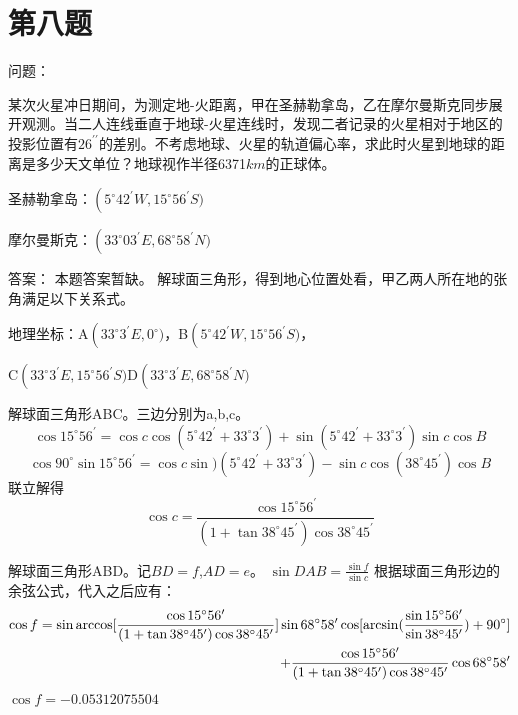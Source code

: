 \documentclass[a4paper,12pt]{report}
\begin{document}
\section{第八题}
问题：

某次火星冲日期间，为测定地-火距离，甲在圣赫勒拿岛，乙在摩尔曼斯克同步展开观测。当二人连线垂直于地球-火星连线时，发现二者记录的火星相对于地区的投影位置有$26^{\prime \prime}$的差别。不考虑地球、火星的轨道偏心率，求此时火星到地球的距离是多少天文单位？地球视作半径6371$km$的正球体。

圣赫勒拿岛：$\left(5^\circ42^\prime W,15^\circ56^\prime S)\right.$

摩尔曼斯克：$\left(33^\circ03^\prime E,68^\circ58^\prime N)\right.$

\noindent 答案：
本题答案暂缺。
\noindent 解球面三角形，得到地心位置处看，甲乙两人所在地的张角满足以下关系式。


地理坐标：A$\left(33^\circ3^\prime E,0^\circ)\right.$，B$\left(5^\circ42^\prime W,15^\circ56^\prime S)\right.$，

C$\left(33^\circ3^\prime E,15^\circ56^\prime S)\right.$D$\left(33^\circ3^\prime E,68^\circ58^\prime N)\right.$

解球面三角形ABC。三边分别为a,b,c。
\begin{equation}
	\cos15^\circ56^\prime =\cos c\cos(5^\circ42^\prime+33^\circ3^\prime)+\sin(5^\circ42^\prime+33^\circ3^\prime)\sin c\cos B
\end{equation}
\begin{equation}
	\cos 90^\circ \sin 15^\circ56^\prime=\cos c\sin )(5^\circ42^\prime+33^\circ3^\prime)-\sin c\cos(38^\circ45^\prime)\cos B
\end{equation}
联立解得
\begin{equation}
	\cos c=\frac{\cos  15^\circ56^\prime}{(1+\tan 38^\circ45^\prime)\cos 38^\circ45^\prime}
\end{equation}


解球面三角形ABD。记$BD=f$,$AD=e$。
$\sin DAB =\frac{\sin f}{\sin c}$
根据球面三角形边的余弦公式，代入之后应有：
\begin{equation}
\begin{split}
	\cos f=\sin{\arccos[\frac{\cos15^\circ56^\prime}{(1+\tan 38^\circ45^\prime)\cos 38^\circ45^\prime}]}\sin68^\circ58^\prime\cos[\arcsin(\frac{\sin15^\circ56^\prime}{\sin38^\circ45^\prime})+90^\circ]\\
	\noindent +\frac{\cos  15^\circ56^\prime}{(1+\tan 38^\circ45^\prime)\cos 38^\circ45^\prime}\cos68^\circ58^\prime 
\end{split}
\end{equation}
\noindent $\cos f=-0.05312075504$
	
\end{document}

